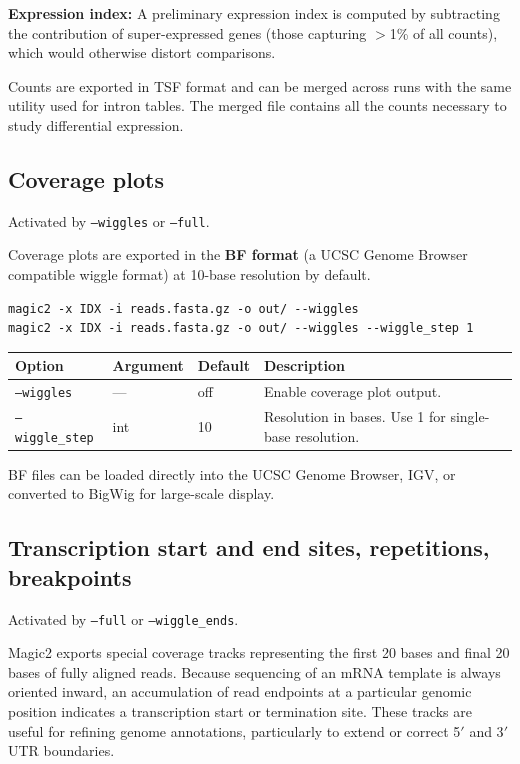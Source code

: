 \documentclass[11pt]{article}
\newcommand{\code}[1]{\texttt{#1}}
\begin{document}
\textbf{Expression index:}
A preliminary expression index is computed by subtracting the
contribution of super-expressed genes (those capturing $>$1\% of all
counts), which would otherwise distort comparisons.

Counts are exported in TSF format and can be merged across runs with
the same utility used for intron tables. The merged file contains
all the counts necessary to study differential expression.

\subsection{Coverage plots}
\label{sec:wiggles}

Activated by \code{--wiggles} or \code{--full}.

Coverage plots are exported in the \textbf{BF format} (a UCSC Genome
Browser compatible wiggle format) at 10-base resolution by default.

\begin{lstlisting}
magic2 -x IDX -i reads.fasta.gz -o out/ --wiggles
magic2 -x IDX -i reads.fasta.gz -o out/ --wiggles --wiggle_step 1
\end{lstlisting}

\begin{center}
\begin{tabular}{lll p{5.5cm}}
\toprule
\textbf{Option} & \textbf{Argument} & \textbf{Default} & \textbf{Description} \\
\midrule
\code{--wiggles}      & ---  & off & Enable coverage plot output. \\
\code{--wiggle\_step} & int  & 10  & Resolution in bases.  Use 1 for
                                     single-base resolution. \\
\bottomrule
\end{tabular}
\end{center}

BF files can be loaded directly into the UCSC Genome Browser, IGV, or
converted to BigWig for large-scale display.

\subsection{Transcription start and end sites, repetitions, breakpoints}
\label{sec:tss}

Activated by \code{--full} or \code{--wiggle\_ends}.

Magic2 exports special coverage tracks representing the first 20 bases
and final 20 bases of fully aligned reads.  Because sequencing of an
mRNA template is always oriented inward, an accumulation of read
endpoints at a particular genomic position indicates a transcription
start or termination site.  These tracks are useful for refining genome
annotations, particularly to extend or correct 5$'$ and 3$'$ UTR
boundaries.
\end{document}
